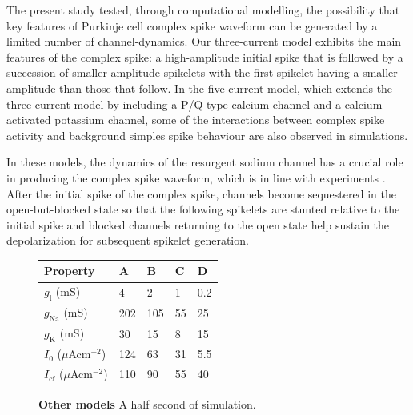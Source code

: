 \documentclass[twocolumn]{svjour3}          %
\renewcommand{\k}{\mathrm{K}}
\newcommand{\na}{\mathrm{Na}}
\begin{document}
The present study tested, through computational modelling, the
possibility that key features of Purkinje cell complex spike waveform
can be generated by a limited number of channel-dynamics. Our
three-current model exhibits the main features of the complex spike: a
high-amplitude initial spike that is followed by a succession of
smaller amplitude spikelets with the first spikelet having a smaller
amplitude than those that follow. In the five-current model, which
extends the three-current model by including a P/Q type calcium
channel and a calcium-activated potassium channel, some of the
interactions between complex spike activity and background simples
spike behaviour are also observed in simulations.

In these models, the dynamics of the resurgent sodium channel has a
crucial role in producing the complex spike waveform, which is in line
with experiments
\citep{RamanBean1997,NolanEtAl2003,KhaliqRaman2006}. After the initial
spike of the complex spike, channels become sequestered in the
open-but-blocked state so that the following spikelets are stunted
relative to the initial spike and blocked channels returning to the
open state help sustain the depolarization for subsequent spikelet
generation.


\begin{figure}[!ht]
\caption{\textbf{Other models} A half second of simulation.
}

  \begin{center}
    \begin{tabular}{|l l l l l|}
      \hline
      Property &  \textbf{A} & \textbf{B} & \textbf{C} & \textbf{D}\\ \hline
      $g_{\mathrm{l}}$ (mS)& 4& 2&1&0.2\\
        $g_\na$ (mS)&202&105&55&25\\
        $g_\k$ (mS)&30&15&8&15\\
      $I_0$ ($\mu$Acm$^{-2}$)  &124         &63&31&5.5\\
      $I_{\mathrm{cf}}$ ($\mu$Acm$^{-2}$) &110&90&55&40\\
      \hline
    \end{tabular}
    \end{center}


\label{Fig:gl_3}
\end{figure}

\begin{figure}
  \begin{center}
    
  \end{center}
  \end{figure}
\end{document}
